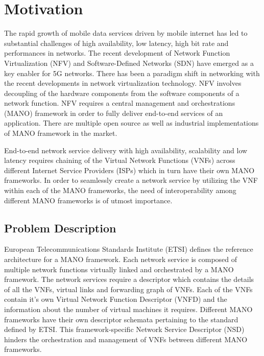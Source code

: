 \chapter{Motivation}
\label{ch:Motivation}
The rapid growth of mobile data services driven by mobile internet has led to substantial challenges of high availability, low latency, high bit rate and performances in networks. The recent development of Network Function Virtualization (NFV) and Software-Defined Networks (SDN) have emerged as a key enabler for 5G networks. 
There has been a paradigm shift in networking with the recent developments in network virtualization technology. NFV involves decoupling of the hardware components from the software components of a network function. NFV requires a central management and orchestrations (MANO) framework  in order to fully deliver end-to-end services of an application. There are multiple open source as well as industrial implementations of MANO framework in the market. 

End-to-end network service delivery with high availability, scalability and low latency requires chaining of the Virtual Network Functions (VNFs) across different Internet Service Providers (ISPs) which in turn have their own MANO frameworks. In order to seamlessly create a network service by utilizing the VNF within each of the MANO frameworks, the need of interoperability among different MANO frameworks is of utmost importance.


\section{Problem Description}

European Telecommunications Standards Institute (ETSI) defines the reference architecture for a MANO framework. Each network service is composed of multiple network functions virtually linked and orchestrated by a MANO framework. The network services require a descriptor which contains the details of all the VNFs, virtual links and forwarding graph of VNFs. Each of the VNFs contain it's own Virtual Network Function Descriptor (VNFD) and the information about the number of virtual machines it requires. Different MANO frameworks have their own descriptor schemata pertaining to the standard defined by ETSI. This framework-specific Network Service Descriptor (NSD) hinders the orchestration and management of VNFs between different MANO frameworks. 

